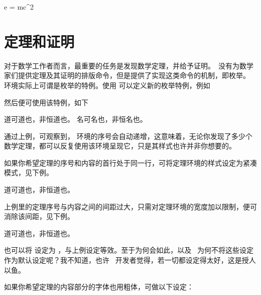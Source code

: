 \setupformula[left={[}, right={]}]
\startplaceformula[在此放置引用]
\startformula
e = mc^2
\stopformula
\stopplaceformula

\section{定理和证明}

对于数学工作者而言，最重要的任务是发现数学定理，并给予证明。\CONTEXT\ 没有为数学家们提供定理及其证明的排版命令，但是提供了实现这类命令的机制，即枚举。 环境实际上可谓是枚举的特例。使用  可以定义新的枚举特例，例如

\startTEX
{}
\stopTEX

\noindent 然后便可使用该特例，如下

\startexample
\starttheorem
道可道也，非恒道也。
\stoptheorem
\starttheorem
名可名也，非恒名也。
\stoptheorem
\stopexample
{}

\noindent 通过上例，可观察到， 环境的序号会自动递增，这意味着，无论你发现了多少个数学定理，都可以反复使用该环境呈现它，只是其样式也许并非你想要的。

如果你希望定理的序号和内容的首行处于同一行，可将定理环境的样式设定为紧凑模式，见下例。

\startexample
\setupenumeration[theorem][alternative=serried]
\starttheorem
道可道也，非恒道也。
\stoptheorem
\stopexample
{}

上例里的定理序号与内容之间的间距过大，只需对定理环境的宽度加以限制，便可消除该间距，见下例。

\startexample
\setupenumeration[theorem]
                 [alternative=serried, width=broad]
\starttheorem 道可道也，非恒道也。 \stoptheorem
\stopexample
{}

\noindent 也可以将  设定为 ，与上例设定等效。至于为何会如此，以及 \CONTEXT\ 为何不将这些设定作为默认设定呢？我不知道，也许 \CONTEXT\ 开发者觉得，若一切都设定得太好，这是授人以鱼。

如果你希望定理的内容部分的字体也用粗体，可做以下设定：

\startTEX
\setupenumeration[theorem]
                 [alternative=serried, width=broad, style=bold]
\stopTEX

